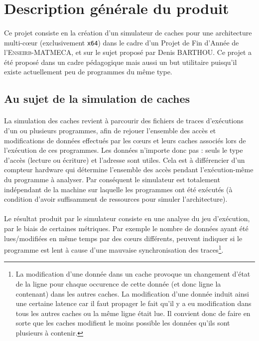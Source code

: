 \section{Description générale du produit}

\paragraph{}
Ce projet consiste en la création d'un simulateur de caches pour une architecture multi-c\oe ur (exclusivement \verb!x64!) dans le cadre d'un Projet de Fin d'Année de l'\textsc{Enseirb-MATMECA}, et sur le sujet proposé par Denis BARTHOU. Ce projet a été proposé dans un cadre pédagogique mais aussi un but utilitaire puisqu'il existe actuellement peu de programmes du même type.

\subsection{Au sujet de la simulation de caches}

\paragraph{}
La simulation des caches revient à parcourir des fichiers de traces d'exécutions d'un ou plusieurs programmes, afin de rejouer l'ensemble des accès et modifications de données effectués par les c\oe urs et leurs caches associés lors de l'exécution de ces programmes. Les données n'importe donc pas : seuls le type d'accès (lecture ou écriture) et l'adresse sont utiles. Cela est à différencier d'un compteur hardware qui détermine l'ensemble des accès pendant l'exécution-même du programme à analyser. Par conséquent le simulateur est totalement indépendant de la machine sur laquelle les programmes ont été exécutés (à condition d'avoir suffisamment de ressources pour simuler l'architecture).   

\paragraph{}
Le résultat produit par le simulateur consiste en une analyse du jeu d'exécution, par le biais de certaines métriques. Par exemple le nombre de données ayant été lues/modifiées en même temps par des c\oe urs différents, peuvent indiquer si le programme est lent à cause d'une mauvaise synchronisation des traces\footnote{La modification d'une donnée dans un cache provoque un changement d'état de la ligne pour chaque occurence de cette donnée (et donc ligne la contenant) dans les autres caches. La modification d'une donnée induit ainsi une certaine latence car il faut propager le fait qu'il y a eu modification dans tous les autres caches ou la même ligne était lue. Il convient donc de faire en sorte que les caches modifient le moins possible les données qu'ils sont plusieurs à contenir.}.

